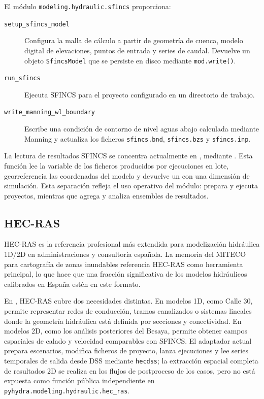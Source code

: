 El módulo \texttt{modeling.hydraulic.sfincs} proporciona:
\begin{description}
  \item[\texttt{setup\_sfincs\_model}] Configura la malla de cálculo a partir de geometría de cuenca, modelo digital de elevaciones, puntos de entrada y series de caudal. Devuelve un objeto \texttt{SfincsModel} que se persiste en disco mediante \texttt{mod.write()}.

  \item[\texttt{run\_sfincs}] Ejecuta SFINCS para el proyecto configurado en un directorio de trabajo.

  \item[\texttt{write\_manning\_wl\_boundary}] Escribe una condición de contorno de nivel aguas abajo calculada mediante Manning y actualiza los ficheros \texttt{sfincs.bnd}, \texttt{sfincs.bzs} y \texttt{sfincs.inp}.
\end{description}

La lectura de resultados SFINCS se concentra actualmente en , mediante . Esta función lee la variable  de los ficheros  producidos por ejecuciones en lote, georreferencia las coordenadas del modelo y devuelve un  con una dimensión de simulación. Esta separación refleja el uso operativo del módulo:  prepara y ejecuta proyectos, mientras que  agrega y analiza ensembles de resultados.

\subsection{HEC-RAS}

HEC-RAS \parencite{brunner2016hecras} es la referencia profesional más extendida para modelización hidráulica 1D/2D en administraciones y consultoría española. La memoria del MITECO para cartografía de zonas inundables \parencite{marm2011guia} referencia HEC-RAS como herramienta principal, lo que hace que una fracción significativa de los modelos hidráulicos calibrados en España estén en este formato.

En \hydra, HEC-RAS cubre dos necesidades distintas. En modelos 1D, como Calle 30, permite representar redes de conducción, tramos canalizados o sistemas lineales donde la geometría hidráulica está definida por secciones y conectividad. En modelos 2D, como los análisis posteriores del Besaya, permite obtener campos espaciales de calado y velocidad comparables con SFINCS. El adaptador actual prepara escenarios, modifica ficheros de proyecto, lanza ejecuciones y lee series temporales de salida desde DSS mediante \texttt{hecdss}; la extracción espacial completa de resultados 2D se realiza en los flujos de postproceso de los casos, pero no está expuesta como función pública independiente en \texttt{pyhydra.modeling.hydraulic.hec\_ras}.

